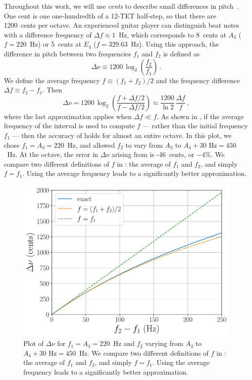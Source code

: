 Throughout this work, we will use \emph{cents} to describe small differences in pitch~\cite{ref:durfee2015pms}. One cent is one one-hundredth of a 12-TET half-step, so that there are 1200~cents per octave. An experienced guitar player can distinguish beat notes with a difference frequency of $\Delta f \approx 1$~Hz, which corresponds to 8~cents at $A_3$ ($f = 220$~Hz) or 5~cents at $E_4$ ($f = 329.63$~Hz). Using this approach, the difference in pitch between two frequencies $f_1$ and $f_2$ is defined as
 \begin{equation} \label{eqn:cents_def}
\Delta \nu \equiv 1200\, \log_2\left(\frac{f_2}{f_1}\right)\, .
 \end{equation}
We define the average frequency $f \equiv (f_1 + f_2) / 2$ and the frequency difference $\Delta f \equiv f_2 - f_1$. Then
 \begin{equation} \label{eqn:cents_approx}
\Delta \nu = 1200\, \log_2\left(\frac{f + \Delta f / 2}{f - \Delta f /2}\right) \approx \frac{1200}{\ln 2}\, \frac{\Delta f}{f}\, ,
 \end{equation}
where the last approximation applies when $\Delta f \ll f$. As shown in , if the average frequency of the interval is used to compute $f$ --- rather than the initial frequency $f_1$ --- then the accuracy of  holds for almost an entire octave. In this plot, we chose $f_1 = A_3 = 220$~Hz, and allowed $f_2$ to vary from $A_3$ to $A_4 + 30 \textrm{ Hz} = 450$~Hz. At the octave, the error in $\Delta \nu$ arising from  is -46~cents, or $-4$\%. We compare two different definitions of $f$ in : the average of $f_1$ and $f_2$, and simply $f = f_1$. Using the average frequency leads to a significantly better approximation.

\begin{figure}
    \centering
    \includegraphics[width=6.5in]{../figures/diff_pitch}
    \caption{\label{fig:diff_pitch} Plot of $\Delta \nu$ for $f_1 = A_3 = 220$~Hz and $f_2$ varying from $A_3$ to $A_4 + 30 \textrm{ Hz} = 450$~Hz. We compare two different definitions of $f$ in : the average of $f_1$ and $f_2$, and simply $f = f_1$. Using the average frequency leads to a significantly better approximation.}
\end{figure}
  


